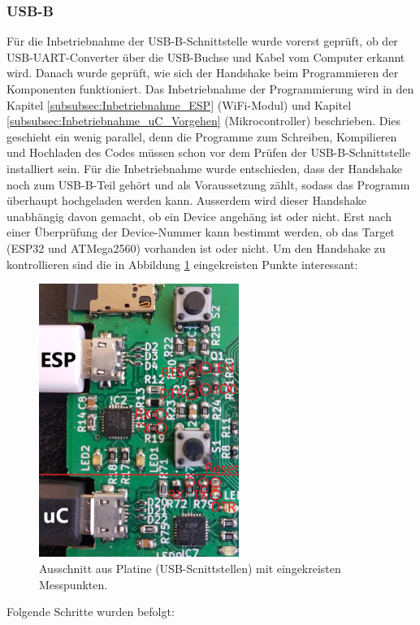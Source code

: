 \subsubsection{USB-B}
\label{subsubsec:Inbetriebnahme_USB-B}

Für die Inbetriebnahme der USB-B-Schnittstelle wurde vorerst geprüft, ob der USB-UART-Converter über die USB-Buchse und Kabel vom Computer erkannt wird. Danach wurde geprüft, wie sich der Handshake beim Programmieren der Komponenten funktioniert. Das Inbetriebnahme der Programmierung wird in den Kapitel \ref{subsubsec:Inbetriebnahme_ESP} (WiFi-Modul) und Kapitel \ref{subsubsec:Inbetriebnahme_uC_Vorgehen} (Mikrocontroller) beschrieben. Dies geschieht ein wenig parallel, denn die Programme zum Schreiben, Kompilieren und Hochladen des Codes müssen schon vor dem Prüfen der USB-B-Schnittstelle installiert sein. Für die Inbetriebnahme wurde entschieden, dass der Handshake noch zum USB-B-Teil gehört und als Voraussetzung zählt, sodass das Programm überhaupt hochgeladen werden kann. Ausserdem wird dieser Handshake unabhängig davon gemacht, ob ein Device angehäng ist oder nicht. Erst nach einer Überprüfung der Device-Nummer kann bestimmt werden, ob das Target (ESP32 und ATMega2560) vorhanden ist oder nicht. Um den Handshake zu kontrollieren sind die in Abbildung \ref{fig:USB_B_Print} eingekreisten Punkte interessant:


\begin{figure}[h!]
\center
\includegraphics[width = 0.58\textwidth]{graphics/USB_B_Print}
\caption{Ausschnitt aus Platine (USB-Scnittstellen) mit eingekreisten Messpunkten.}
\label{fig:USB_B_Print}
\end{figure}
\newpage
Folgende Schritte wurden befolgt:


